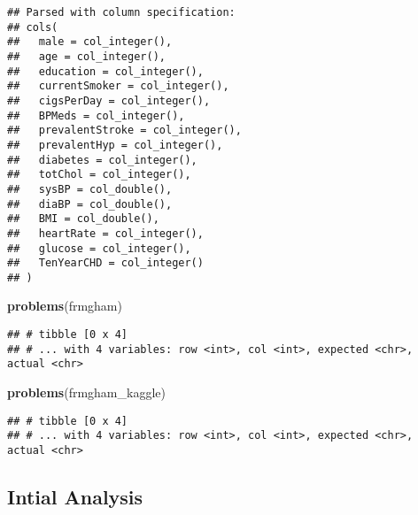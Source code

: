 \documentclass[]{article}
\newenvironment{Shaded}{\begin{snugshade}}{\end{snugshade}}
\newcommand{\KeywordTok}[1]{\textcolor[rgb]{0.13,0.29,0.53}{\textbf{#1}}}
\newcommand{\StringTok}[1]{\textcolor[rgb]{0.31,0.60,0.02}{#1}}
\newcommand{\OperatorTok}[1]{\textcolor[rgb]{0.81,0.36,0.00}{\textbf{#1}}}
\newcommand{\NormalTok}[1]{#1}
\begin{document}
\begin{verbatim}
## Parsed with column specification:
## cols(
##   male = col_integer(),
##   age = col_integer(),
##   education = col_integer(),
##   currentSmoker = col_integer(),
##   cigsPerDay = col_integer(),
##   BPMeds = col_integer(),
##   prevalentStroke = col_integer(),
##   prevalentHyp = col_integer(),
##   diabetes = col_integer(),
##   totChol = col_integer(),
##   sysBP = col_double(),
##   diaBP = col_double(),
##   BMI = col_double(),
##   heartRate = col_integer(),
##   glucose = col_integer(),
##   TenYearCHD = col_integer()
## )
\end{verbatim}

\begin{Shaded}
\begin{Highlighting}[]
\KeywordTok{problems}\NormalTok{(frmgham)}
\end{Highlighting}
\end{Shaded}

\begin{verbatim}
## # tibble [0 x 4]
## # ... with 4 variables: row <int>, col <int>, expected <chr>, actual <chr>
\end{verbatim}

\begin{Shaded}
\begin{Highlighting}[]
\KeywordTok{problems}\NormalTok{(frmgham_kaggle)}
\end{Highlighting}
\end{Shaded}

\begin{verbatim}
## # tibble [0 x 4]
## # ... with 4 variables: row <int>, col <int>, expected <chr>, actual <chr>
\end{verbatim}

\subsection{Intial Analysis}\label{intial-analysis}

\begin{Shaded}
\end{Shaded}
\end{document}
